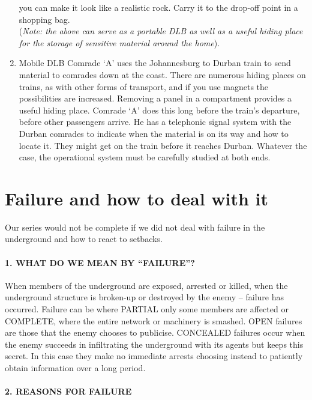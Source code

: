 \begin{enumerate}
  you can make it look like a realistic rock. Carry it to the drop-off
  point in a shopping bag.\\
   (\emph{Note: the above can serve as a portable DLB as well as a
  useful hiding place for the storage of sensitive material around the
  home}).
\item
  {Mobile DLB} Comrade `A' uses the Johannesburg to Durban train to send
  material to comrades down at the coast. There are numerous hiding
  places on trains, as with other forms of transport, and if you use
  magnets the possibilities are increased. Removing a panel in a
  compartment provides a useful hiding place. Comrade `A' does this long
  before the train's departure, before other passengers arrive. He has a
  telephonic signal system with the Durban comrades to indicate when the
  material is on its way and how to locate it. They might get on the
  train before it reaches Durban. Whatever the case, the operational
  system must be carefully studied at both ends.
\end{enumerate}

\section{Failure and how to deal with it}

Our series would not be complete if we did not deal with failure in the
underground and how to react to setbacks.

\paragraph{1. WHAT DO WE MEAN BY
``FAILURE''?}

When members of the underground are exposed, arrested or killed, when
the underground structure is broken-up or destroyed by the enemy --
failure has occurred. Failure can be where PARTIAL only some members are
affected or COMPLETE, where the entire network or machinery is smashed.
OPEN failures are those that the enemy chooses to publicise. CONCEALED
failures occur when the enemy succeeds in infiltrating the underground
with its agents but keeps this secret. In this case they make no
immediate arrests choosing instead to patiently obtain information over
a long period.

\paragraph{2. REASONS FOR FAILURE}

